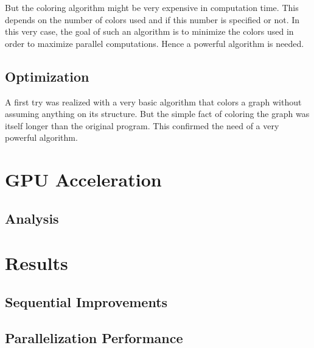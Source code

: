 \documentclass[fleqn,11pt]{SelfArx} %
\begin{document}
But the coloring algorithm might be very expensive in computation time. This depends on the number of colors used and if this number is specified or not. In this very case, the goal of such an algorithm is to minimize the colors used in order to maximize parallel computations. Hence a powerful algorithm is needed.

\subsection{Optimization}

A first try was realized with a very basic algorithm that colors a graph without assuming anything on its structure. But the simple fact of coloring the graph was itself longer than the original program. This confirmed the need of a very powerful algorithm.


\section{GPU Acceleration}

\subsection{Analysis}


\section{Results}

\subsection{Sequential Improvements}

\subsection{Parallelization Performance}
\end{document}
